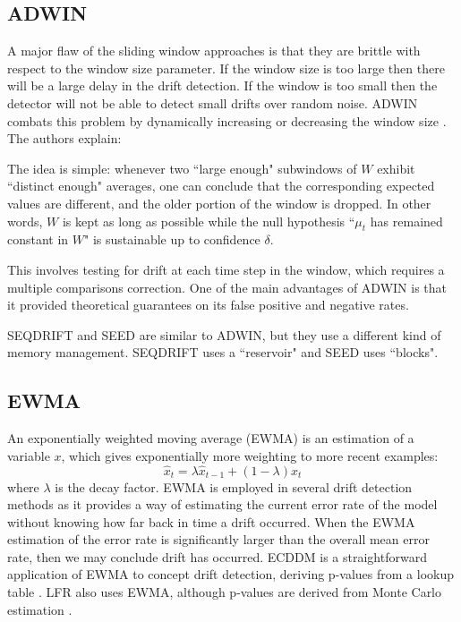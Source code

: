 \subsection{ADWIN}

A major flaw of the sliding window approaches is that they are brittle with respect to the window size parameter. If the window size is too large then there will be a large delay in the drift detection. If the window is too small then the detector will not be able to detect small drifts over random noise. ADWIN combats this problem by dynamically increasing or decreasing the window size \cite{ADWIN}. The authors explain:
\begin{displayquote}
The idea is simple: whenever two ``large enough" subwindows of $W$ exhibit ``distinct enough" averages, one can conclude that the corresponding expected values are different, and the older portion of the window is dropped. In other words, $W$ is kept as long as possible while the null hypothesis ``$\mu_t$ has remained constant in $W$" is sustainable up to confidence $\delta$.
\end{displayquote}
This involves testing for drift at each time step in the window, which requires a multiple comparisons correction. One of the main advantages of ADWIN is that it provided theoretical guarantees on its false positive and negative rates.

SEQDRIFT \cite{SEQDRIFT} and SEED \cite{SEED} are similar to ADWIN, but they use a different kind of memory management.%
SEQDRIFT uses a ``reservoir" and SEED uses ``blocks". %

\subsection{EWMA}

An exponentially weighted moving average (EWMA) is an estimation of a variable $x$, which gives exponentially more weighting to more recent examples:
\begin{equation}
  \hat{x}_t = \lambda \hat{x}_{t-1} + (1-\lambda) x_t
\end{equation}
where $\lambda$ is the decay factor. EWMA is employed in several drift detection methods as it provides a way of estimating the current error rate of the model without knowing how far back in time a drift occurred. When the EWMA estimation of the error rate is significantly larger than the overall mean error rate, then we may conclude drift has occurred. ECDDM is a straightforward application of EWMA to concept drift detection, deriving p-values from a lookup table \cite{ECDDM}. LFR also uses EWMA, although p-values are derived from Monte Carlo estimation \cite{LFR}.

